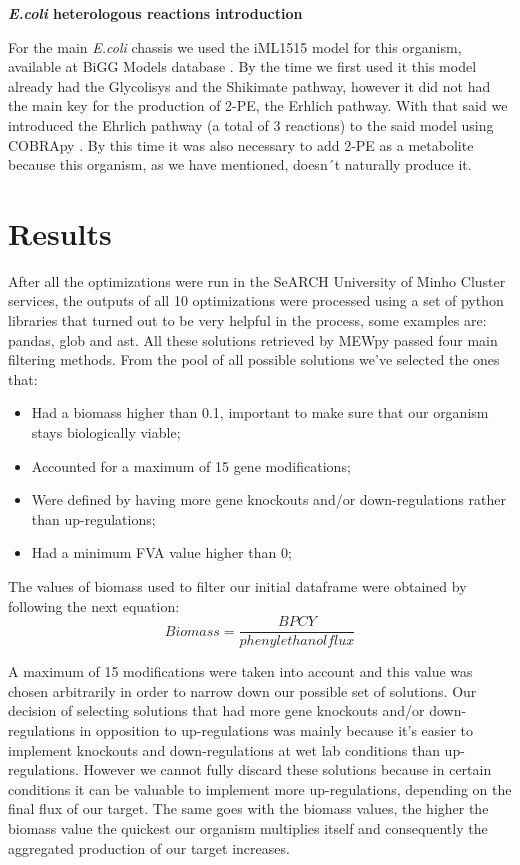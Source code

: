 \documentclass[runningheads]{llncs}
\begin{document}
\textbf{\emph{E.coli} heterologous reactions introduction}

For the main \emph{E.coli} chassis we used the iML1515 model for this organism, available at BiGG Models database \cite{biggmodels}. By the time we first used it this model already had the Glycolisys and the Shikimate pathway, however it did not had the main key for the production of 2-PE, the Erhlich pathway. With that said we introduced the Ehrlich pathway (a total of 3 reactions) to the said model using COBRApy \cite{cobrapy}. By this time it was also necessary to add 2-PE as a metabolite because this organism, as we have mentioned, doesn´t naturally produce it.

\section{Results}
After all the optimizations were run in the SeARCH University of Minho Cluster services, the outputs of all 10 optimizations were processed using a set of python libraries that turned out to be very helpful in the process, some examples are: pandas, glob and ast.
All these solutions retrieved by MEWpy passed four main filtering methods. From the pool of all possible solutions we've selected the ones that:
\begin{itemize}
    \item[\ding{227}] Had a biomass higher than 0.1, important to make sure that our organism stays biologically viable;
    \item[\ding{227}] Accounted for a maximum of 15 gene modifications;
    \item[\ding{227}] Were defined by having more gene knockouts and/or down-regulations rather than up-regulations;
    \item[\ding{227}] Had a minimum FVA value higher than 0;
\end{itemize}

The values of biomass used to filter our initial dataframe were obtained by following the next equation: \[ Biomass = \frac{BPCY}{phenylethanol flux} \]



A maximum of 15 modifications were taken into account and this value was chosen arbitrarily in order to narrow down our possible set of solutions.
Our decision of selecting solutions that had more gene knockouts and/or down-regulations in opposition to up-regulations was mainly because it's easier to implement knockouts and down-regulations at wet lab conditions than up-regulations. However we cannot fully discard these solutions because in certain conditions it can be valuable to implement more up-regulations, depending on the final flux of our target. The same goes with the biomass values, the higher the biomass value the quickest our organism multiplies itself and consequently the aggregated production of our target increases.
\end{document}
